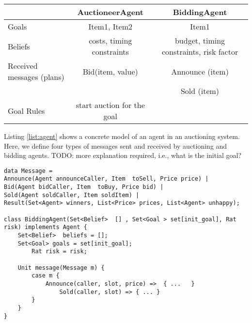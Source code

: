 




\begin{table}
\begin{tabular}{|l|c|c|}
	\hline
	& AuctioneerAgent & BiddingAgent \\
	\hline
Goals & Item1, Item2 & Item1 \\
Beliefs & costs, timing constraints & budget, timing constraints, risk factor \\	
Received messages (plans) & Bid(item, value) & Announce (item) \\
 & & Sold (item) \\
Goal Rules & start auction for the goal & \\
\hline
\end{tabular}
\end{table}



Listing \ref{list:agent} shows a concrete model of an agent  in an auctioning system.
Here, we define four types of messages sent and received by auctioning and bidding agents.  TODO: more explanation required, i.e., what is the initial goal?


\begin{lstlisting}[caption= Agent Model, label=list:agent]
data Message = 
Announce(Agent announceCaller, Item  toSell, Price price) | 
Bid(Agent bidCaller, Item  toBuy, Price bid) |
Sold(Agent soldCaller, Item soldItem) |
Result(Set<Agent> winners, List<Price> prices, List<Agent> unhappy);

class BiddingAgent(Set<Belief>  [] , Set<Goal > set[init_goal], Rat risk) implements Agent {
	Set<Belief>  beliefs = [];
	Set<Goal> goals = set[init_goal];
        Rat risk = risk;
	
	Unit message(Message m) {
		case m {
			Announce(caller, slot, price) =>  { ...   } 
		        Sold(caller, slot) => { ... }
		}
	}
}
\end{lstlisting}


